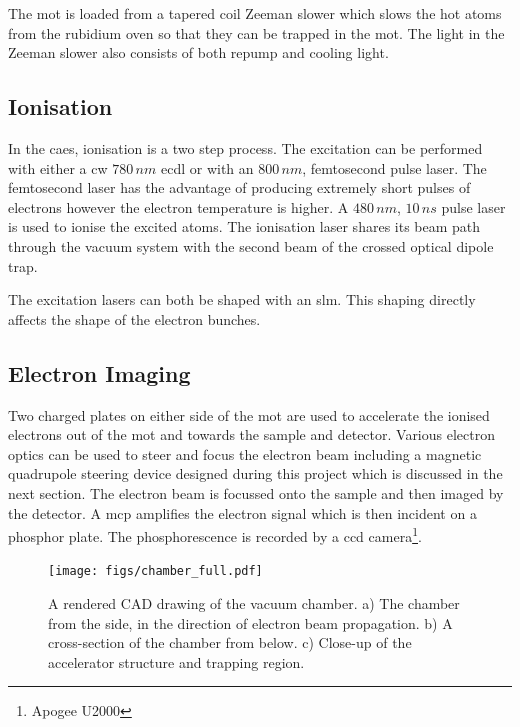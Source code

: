 The \gls{mot} is loaded from a tapered coil Zeeman slower which slows the hot atoms from the rubidium oven so that they can be trapped in the \gls{mot}. The light in the Zeeman slower also consists of both repump and cooling light.

\subsection{Ionisation}

In the \gls{caes}, ionisation is a two step process. The excitation can be performed with either a \gls{cw} $780\,\unit{nm}$ \gls{ecdl} or with an $800\,\unit{nm}$, femtosecond pulse laser. The femtosecond laser has the advantage of producing extremely short pulses of electrons however the electron temperature is higher\cite{mcculloch_high_2012}. A $480\,\unit{nm}$, $10\,\unit{ns}$ pulse laser is used to ionise the excited atoms. The ionisation laser shares its beam path through the vacuum system with the second beam of the crossed optical dipole trap.

The excitation lasers can both be shaped with an \gls{slm}. This shaping directly affects the shape of the electron bunches\cite{mcculloch_arbitrarily_2011}.

\subsection{Electron Imaging}

Two charged plates on either side of the \gls{mot} are used to accelerate the ionised electrons out of the \gls{mot} and towards the sample and detector. Various electron optics can be used to steer and focus the electron beam including a magnetic quadrupole steering device designed during this project which is discussed in the next section. The electron beam is focussed onto the sample and then imaged by the detector. A \gls{mcp} amplifies the electron signal which is then incident on a phosphor plate. The phosphorescence is recorded by a \gls{ccd} camera\footnote{Apogee U2000}.

\begin{landscape}
\begin{figure}[p]
\centering
\texttt{[image: figs/chamber\_full.pdf]}
 \caption{A rendered CAD drawing of the vacuum chamber\cite{sheludko_shaped_2010}. a) The chamber from the side, in the direction of electron beam propagation. b) A cross-section of the chamber from below. c) Close-up of the accelerator structure and trapping region.}
\label{fig:app_complete_chamber}
\end{figure}
\end{landscape}

